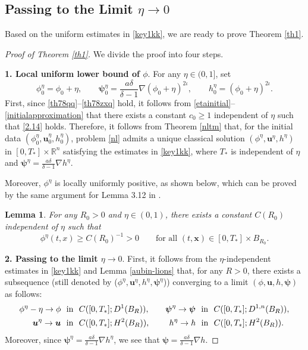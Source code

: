 \documentclass[11pt,reqno]{amsart}
\newtheorem{lem}{Lemma}[section]
\numberwithin{rk}{section}
\numberwithin{prop}{section}
\numberwithin{mydef}{section}
\numberwithin{lem}{section}
\numberwithin{equation}{section}
\numberwithin{thm}{section}
\begin{document}
\subsection{Passing to the Limit $\eta\to 0$}
Based on the uniform estimates in \eqref{key1kk}, we are ready to prove Theorem  \ref{th1}.

\begin{proof}[Proof of {\rm Theorem \ref{th1}}] 
We divide the proof into four steps.

\smallskip
\textbf{1. Local uniform lower bound of $\phi$}. For any $\eta\in (0,1]$, set 
\begin{equation*}
\phi_0^\eta=\phi_0+\eta,\qquad \boldsymbol{\psi}^\eta_0=\frac{a\delta}{\delta-1}\nabla (\phi_0+\eta)^{2\iota},\qquad h_0^\eta=(\phi_0+\eta)^{2\iota}.
\end{equation*}
First, since \eqref{th78qq}--\eqref{th78zxq} hold, it follows from  \eqref{etainitial}--\eqref{initialapproximation} that  there exists a constant $c_0\geq 1$ independent of $\eta$ such that \eqref{2.14} holds.
Therefore, it follows from Theorem \ref{nltm} that, for the initial data $(\phi^\eta_0,\boldsymbol{u}^\eta_0,h^\eta_0)$, problem \eqref{nl} admits a unique classical solution  $(\phi^\eta,\boldsymbol{u}^\eta, h^\eta)$ in $[0,T_*]\times \mathbb{R}^n$ satisfying the  estimates in \eqref{key1kk}, where $T_*$ is independent of $\eta$ and $\boldsymbol{\psi}^\eta=\frac{a\delta}{\delta-1}\nabla h^\eta$.

Moreover, $\phi^\eta$ is locally uniformly positive, as shown below, which can be proved by the same argument for Lemma 3.12 in \cite{dxz}.
\begin{lem}\label{phieta}
For any $R_0>0$ and $\eta\in (0,1)$, there exists a constant $C(R_0)$ independent of $\eta$ such that
\begin{equation*}
\phi^\eta(t,x)\geq C(R_0)^{-1}>0 \qquad \text{for all $(t,\boldsymbol{x})\in [0,T_*]\times B_{R_0}$}.
\end{equation*}
\end{lem}


\smallskip
\textbf{2. Passing to the limit $\eta\to 0$}. First, it follows from  the $\eta$-independent estimates in \eqref{key1kk} and Lemma \ref{aubin-lions}  that,
 for any $R>0$, there exists a subsequence (still denoted by ($\phi^\eta,\boldsymbol{u}^\eta, h^\eta,\boldsymbol{\psi}^\eta$)) converging to a limit  $(\phi,\boldsymbol{u}, h,\boldsymbol{\psi})$ as follows:
\begin{equation} \label{nonlinearstrongconvergence}
\begin{aligned}
\phi^\eta-\eta\to \phi \ \ &\text{in} \ \ C([0,T_*];D^1(B_R)), \quad &&\boldsymbol{\psi}^\eta\to \boldsymbol{\psi}\ \ \text{in} \ \ C([0,T_*];D^{1,n}(B_R)),\\
\boldsymbol{u}^\eta\to \boldsymbol{u} \ \ &\text{in} \ \ C([0,T_*]; H^2(B_R)),  
\quad &&\hspace{1.6mm} h^\eta\to h\ \ \text{in} \ \ C([0,T_*];H^2(B_R)).
\end{aligned}
\end{equation}
Moreover, since $\boldsymbol{\psi}^\eta=\frac{a\delta}{\delta-1}\nabla h^\eta$, we see that $\boldsymbol{\psi}=\frac{a\delta}{\delta-1}\nabla h$.



\end{proof}
\end{document}
